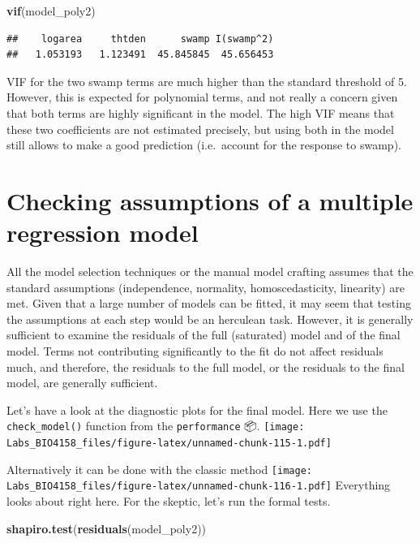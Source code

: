 \documentclass[
  12pt,
]{book}
\newenvironment{Shaded}{\begin{snugshade}}{\end{snugshade}}
\newcommand{\KeywordTok}[1]{\textcolor[rgb]{0.13,0.29,0.53}{\textbf{#1}}}
\newcommand{\NormalTok}[1]{#1}
\begin{document}
\begin{Shaded}
\begin{Highlighting}[]
\KeywordTok{vif}\NormalTok{(model\_poly2)}
\end{Highlighting}
\end{Shaded}

\begin{verbatim}
##    logarea     thtden      swamp I(swamp^2) 
##   1.053193   1.123491  45.845845  45.656453
\end{verbatim}

VIF for the two swamp terms are much higher than the standard threshold of 5. However, this is expected for polynomial terms, and not really a concern given that both terms are highly significant in the model. The high VIF means that these two coefficients are not estimated precisely, but using both in the model still allows to make a good prediction (i.e.~account for the response to swamp).

\hypertarget{checking-assumptions-of-a-multiple-regression-model}{%
\section{Checking assumptions of a multiple regression model}\label{checking-assumptions-of-a-multiple-regression-model}}

All the model selection techniques or the manual model crafting assumes that the standard assumptions (independence, normality, homoscedasticity, linearity) are met. Given that a large number of models can be fitted, it may seem that testing the assumptions at each step would be an herculean task. However, it is generally sufficient to examine the residuals of the full (saturated) model and of the final model. Terms not contributing significantly to the fit do not affect residuals much, and therefore, the residuals to the full model, or the residuals to the final model, are generally sufficient.

Let's have a look at the diagnostic plots for the final model. Here we use the \texttt{check\_model()} function from the \texttt{performance} 📦.
\texttt{[image: Labs\_BIO4158\_files/figure-latex/unnamed-chunk-115-1.pdf]}

Alternatively it can be done with the classic method
\texttt{[image: Labs\_BIO4158\_files/figure-latex/unnamed-chunk-116-1.pdf]}
Everything looks about right here. For the skeptic, let's run the formal tests.

\begin{Shaded}
\begin{Highlighting}[]
\KeywordTok{shapiro.test}\NormalTok{(}\KeywordTok{residuals}\NormalTok{(model\_poly2))}
\end{Highlighting}
\end{Shaded}
\end{document}
